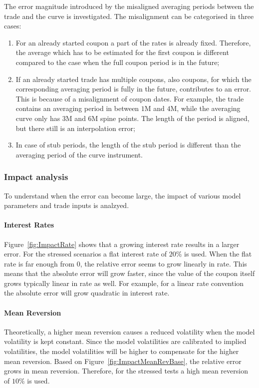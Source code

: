 \documentclass[]{pmv_report} %
\begin{document}
The error magnitude introduced by the misaligned averaging periods between the trade and the curve is investigated.
The misalignment can be categorised in three cases:
\begin{enumerate}
 \item For an already started coupon a part of the rates is already fixed.
 Therefore, the average which has to be estimated for the first coupon is different compared to the case when the full coupon period is in the future;
 \item If an already started trade has multiple coupons, also coupons, for which the corresponding averaging period is fully in the future, contributes to an error.
    This is because of a misalignment of coupon dates.
 For example, the trade contains an averaging period in between $1$M and $4$M, while the averaging curve only has $3$M and $6$M spine points.
 The length of the period is aligned, but there still is an interpolation error;
 \item In case of stub periods, the length of the stub period is different than the averaging period of the curve instrument.
\end{enumerate}

\subsubsection*{Impact analysis}

To understand when the error can become large, the impact of various model parameters and trade inputs is analzyed.

\paragraph{Interest Rates}
Figure~\ref{fig:ImpactRate} shows that a growing interest rate results in a larger error.
For the stressed scenarios a flat interest rate of $20\%$ is used.
When the flat rate is far enough from $0$, the relative error seems to grow linearly in rate.
This means that the absolute error will grow faster, since the value of the coupon itself grows typically linear in rate as well.
For example, for a linear rate convention the absolute error will grow quadratic in interest rate.

\paragraph{Mean Reversion}
Theoretically, a higher mean reversion causes a reduced volatility when the model volatility is kept constant.
Since the model volatilities are calibrated to implied volatilities, the model volatilities will be higher to compensate for the higher mean reversion.
Based on Figure~\ref{fig:ImpactMeanRevBase}, the relative error grows in mean reversion.
Therefore, for the stressed tests a high mean reversion of $10\%$ is used.
\end{document}

